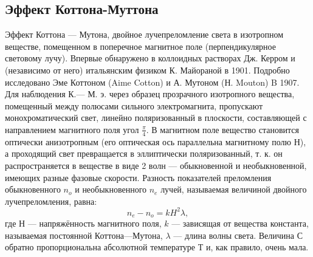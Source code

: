 	\subsection{Эффект Коттона-Муттона}Эффект Коттона — Мутона, двойное лучепреломление света в изотропном веществе, помещенном в поперечное магнитное поле (перпендикулярное световому лучу). Впервые обнаружено в коллоидных растворах Дж. Керром и (независимо от него) итальянским физиком К. Майораной в 1901. Подробно исследовано Эме Коттоном (Aime Cotton) и А. Мутоном (Н. Mouton) B 1907. Для наблюдения К.— М. э. через образец прозрачного изотропного вещества, помещенный между полюсами сильного электромагнита, пропускают монохроматический свет, линейно поляризованный в плоскости, составляющей с направлением магнитного поля угол $\frac{\pi}{4}$. В магнитном поле вещество становится оптически анизотропным (его оптическая ось параллельна магнитному полю $Н$), а проходящий свет превращается в эллиптически поляризованный, т. к. он распространяется в веществе в виде 2 волн — обыкновенной и необыкновенной, имеющих разные фазовые скорости. Разность показателей преломления обыкновенного $n_{o}$ и необыкновенного $n_{e}$ лучей, называемая величиной двойного лучепреломления, равна:
	$$n_{e} - n_{o} = kH^{2}\lambda,$$
	где Н — напряжённость магнитного поля, $k$ — зависящая от вещества константа, называемая постоянной Коттона—Мутона, $\lambda$ — длина волны света. Величина С обратно пропорциональна абсолютной температуре $Т$ и, как правило, очень мала. 